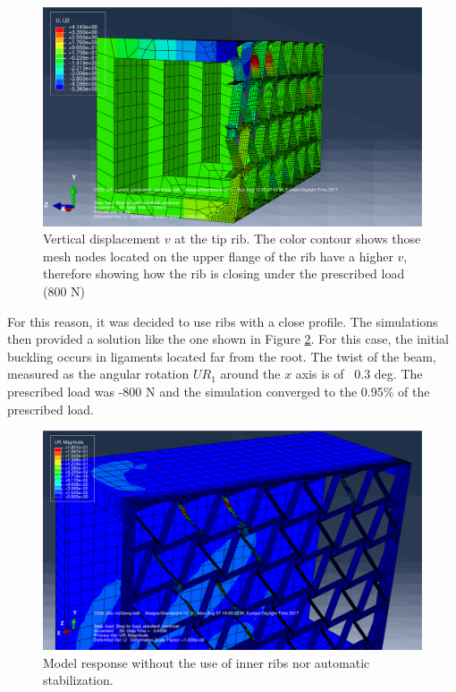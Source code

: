     \begin{figure}[!htpb]
      \centering
      \includegraphics[width=0.8 \textwidth]{../figures/result-model/closeOfRib-800N}
      \caption[Vertical displacement $v$ at the tip rib]{Vertical displacement $v$ at the tip rib. The color contour shows those mesh nodes located on the upper flange of the rib have a higher $v$, therefore showing how the rib is closing under the prescribed load (800 N)}\label{fig:closeOfRib-800N}
    \end{figure}

    For this reason, it was decided to use ribs with a close profile. The simulations then provided a solution like the one shown in Figure \ref{fig:normalCaseNoDampNoInnerRibs_800N}. For this case, the initial buckling occurs in ligaments located far from the root. The twist of the beam, measured as the angular rotation $UR_1$ around the $x$ axis is of ~0.3 deg. The prescribed load was -800 N and the simulation converged to the 0.95\% of the prescribed load. 

    \begin{figure}[!htpb]
      \centering
      \includegraphics[width=0.8 \textwidth]{../figures/result-model/normalCaseNoDampNoInnerRibs_800N}
      \caption[Model response without the use of inner ribs nor automatic stabilization]{Model response without the use of inner ribs nor automatic stabilization.}\label{fig:normalCaseNoDampNoInnerRibs_800N}
    \end{figure}

